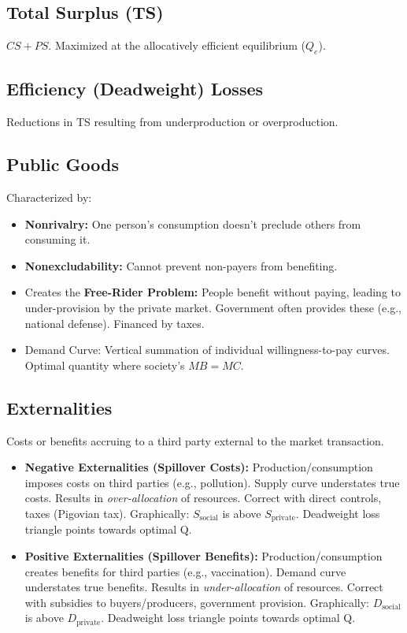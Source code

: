 \documentclass{article}
\begin{document}
\subsection*{Total Surplus (TS)}
$CS + PS$. Maximized at the allocatively efficient equilibrium ($Q_e$).

\subsection*{Efficiency (Deadweight) Losses}
Reductions in TS resulting from underproduction or overproduction.

\subsection*{Public Goods}
Characterized by:
\begin{itemize}
    \item \textbf{Nonrivalry:} One person's consumption doesn't preclude others from consuming it.
    \item \textbf{Nonexcludability:} Cannot prevent non-payers from benefiting.
    \item Creates the \textbf{Free-Rider Problem:} People benefit without paying, leading to under-provision by the private market. Government often provides these (e.g., national defense). Financed by taxes.
    \item Demand Curve: Vertical summation of individual willingness-to-pay curves. Optimal quantity where society's $MB = MC$.
\end{itemize}

\subsection*{Externalities}
Costs or benefits accruing to a third party external to the market transaction.
\begin{itemize}
    \item \textbf{Negative Externalities (Spillover Costs):} Production/consumption imposes costs on third parties (e.g., pollution). Supply curve understates true costs. Results in \textit{over-allocation} of resources. Correct with direct controls, taxes (Pigovian tax). Graphically: $S_{\text{social}}$ is above $S_{\text{private}}$. Deadweight loss triangle points towards optimal Q.
    \item \textbf{Positive Externalities (Spillover Benefits):} Production/consumption creates benefits for third parties (e.g., vaccination). Demand curve understates true benefits. Results in \textit{under-allocation} of resources. Correct with subsidies to buyers/producers, government provision. Graphically: $D_{\text{social}}$ is above $D_{\text{private}}$. Deadweight loss triangle points towards optimal Q.
\end{itemize}
\end{document}
